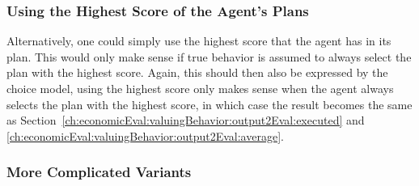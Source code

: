 



\subsubsection{Using the Highest Score of the Agent's Plans}
Alternatively, one could simply use the highest score that the agent has in its plan.  This would only make sense if  true behavior is assumed to always select the plan with the highest score.  Again, this should then also be expressed by the choice model, \ie using the highest score only makes sense when the agent always selects the plan with the highest score, in which case the result becomes the same as Section~\ref{ch:economicEval:valuingBehavior:output2Eval:executed} and \ref{ch:economicEval:valuingBehavior:output2Eval:average}.

\subsubsection{More Complicated Variants}
\label{sec:more-compl-variants}

